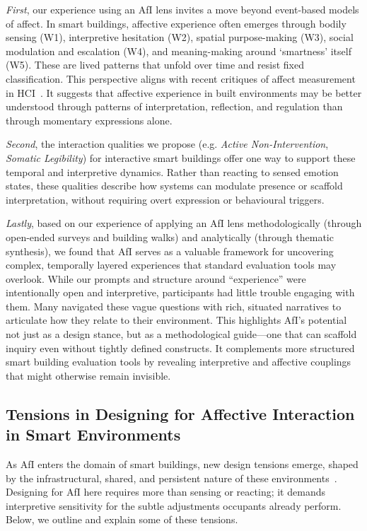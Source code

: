 \textit{First}, our experience using an AfI lens invites a move beyond event-based models of affect. In smart buildings, affective experience often emerges through bodily sensing (W1), interpretive hesitation (W2), spatial purpose-making (W3), social modulation and escalation (W4), and meaning-making around ‘smartness’ itself (W5). These are lived patterns that unfold over time and resist fixed classification. This perspective aligns with recent critiques of affect measurement in HCI~\cite{lottridge2011affective, ahmadpour2025affective}. It suggests that affective experience in built environments may be better understood through patterns of interpretation, reflection, and regulation than through momentary expressions alone.

\textit{Second}, the interaction qualities we propose (e.g. \textit{Active Non-Intervention}, \textit{Somatic Legibility}) for interactive smart buildings offer one way to support these temporal and interpretive dynamics. Rather than reacting to sensed emotion states, these qualities describe how systems can modulate presence or scaffold interpretation, without requiring overt expression or behavioural triggers. 

\textit{Lastly}, based on our experience of applying an AfI lens methodologically (through open-ended surveys and building walks) and analytically (through thematic synthesis), we found that AfI serves as a valuable framework for uncovering complex, temporally layered experiences that standard evaluation tools may overlook. While our prompts and structure around “experience” were intentionally open and interpretive, participants had little trouble engaging with them. Many navigated these vague questions with rich, situated narratives to articulate how they relate to their environment. This highlights AfI’s potential not just as a design stance, but as a methodological guide---one that can scaffold inquiry even without tightly defined constructs. It complements more structured smart building evaluation tools by revealing interpretive and affective couplings that might otherwise remain invisible.

\subsection{Tensions in Designing for Affective Interaction in Smart Environments}
As AfI enters the domain of smart buildings, new design tensions emerge, shaped by the infrastructural, shared, and persistent nature of these environments~\cite{rao2025lessons, rao2025designing}. Designing for AfI here requires more than sensing or reacting; it demands interpretive sensitivity for the subtle adjustments occupants already perform. Below, we outline and explain some of these tensions.


